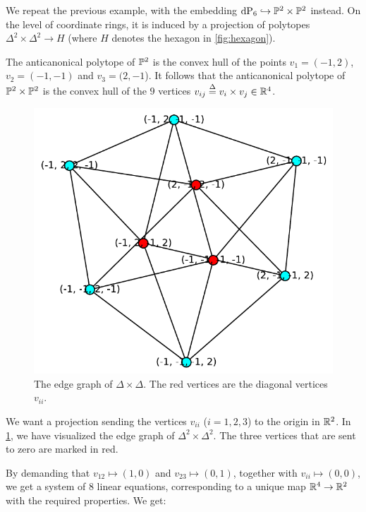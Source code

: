 \begin{example}
\label{example:p2p2}
We repeat the previous example, with the embedding $\dP6 \hookrightarrow \P^2 \times \P^2$ instead. On the level of coordinate rings, it is induced by a projection of polytopes $\Delta^2 \times \Delta^2 \to H$ (where $H$ denotes the hexagon in \cref{fig:hexagon}).

The anticanonical polytope of $\P^2$ is the convex hull of the points $v_1=(-1,2)$, $v_2=(-1,-1)$ and $v_3=(2,-1$). It follows that the anticanonical polytope of $\P^2 \times \P^2$ is the convex hull of the $9$ vertices $v_{ij} \stackrel{\Delta}{=} v_i \times v_j \in \R^4$.

\begin{figure}
  \centering
  \includegraphics[scale=0.7]{./figures/grafDD.pdf}
  \caption{The edge graph of $\Delta \times \Delta$. The red vertices are the diagonal vertices $v_{ii}$.}
  \label{fig:edgegraphDD}
\end{figure}
We want a projection sending the vertices $v_{ii}$ ($i=1,2,3$) to the origin in $\R^2$. In \cref{fig:edgegraphDD}, we have visualized the edge graph of $\Delta^2 \times \Delta^2$. The three vertices that are sent to zero are marked in red.

By demanding that $v_{12} \mapsto (1,0)$ and $v_{23} \mapsto (0,1)$, together with $v_{ii} \mapsto (0,0)$, we get a system of $8$ linear equations, corresponding to a unique map $\R^4 \to \R^2$ with the required properties. We get:


\end{example}
